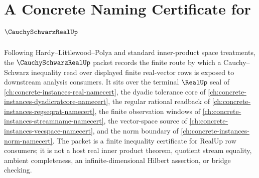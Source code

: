 \chapter{A Concrete Naming Certificate for $\CauchySchwarzRealUp$}
\label{ch:concrete-instances-cauchy-schwarz-real-namecert}

Following Hardy--Littlewood--Polya and standard inner-product space treatments, the $\CauchySchwarzRealUp$ packet records the finite route by which a Cauchy--Schwarz inequality read over displayed finite real-vector rows is exposed to downstream analysis consumers. It sits over the terminal $\RealUp$ seal of \autoref{ch:concrete-instances-real-namecert}, the dyadic tolerance core of \autoref{ch:concrete-instances-dyadicratcore-namecert}, the regular rational readback of \autoref{ch:concrete-instances-regseqrat-namecert}, the finite observation windows of \autoref{ch:concrete-instances-streamname-namecert}, the vector-space source of \autoref{ch:concrete-instances-vecspace-namecert}, and the norm boundary of \autoref{ch:concrete-instances-norm-namecert}. The packet is a finite inequality certificate for RealUp row consumers; it is not a host real inner product theorem, quotient stream equality, ambient completeness, an infinite-dimensional Hilbert assertion, or bridge checking.

